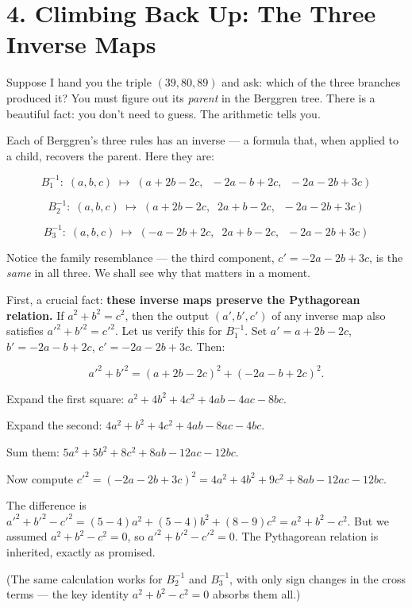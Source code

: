 \section{4. Climbing Back Up: The Three Inverse Maps}\label{ch14-climbing-back-up-the-three-inverse-maps}

Suppose I hand you the triple \((39, 80, 89)\) and ask: which of the three branches produced it? You must figure out its \emph{parent} in the Berggren tree. There is a beautiful fact: you don't need to guess. The arithmetic tells you.

Each of Berggren's three rules has an inverse --- a formula that, when applied to a child, recovers the parent. Here they are:

\[B_1^{-1}:\; (a,b,c) \;\longmapsto\; (a + 2b - 2c,\;\; -2a - b + 2c,\;\; -2a - 2b + 3c)\]

\[B_2^{-1}:\; (a,b,c) \;\longmapsto\; (a + 2b - 2c,\;\; 2a + b - 2c,\;\; -2a - 2b + 3c)\]

\[B_3^{-1}:\; (a,b,c) \;\longmapsto\; (-a - 2b + 2c,\;\; 2a + b - 2c,\;\; -2a - 2b + 3c)\]

Notice the family resemblance --- the third component, \(c' = -2a - 2b + 3c\), is the \emph{same} in all three. We shall see why that matters in a moment.

First, a crucial fact: \textbf{these inverse maps preserve the Pythagorean relation.} If \(a^2 + b^2 = c^2\), then the output \((a', b', c')\) of any inverse map also satisfies \({a'}^2 + {b'}^2 = {c'}^2\). Let us verify this for \(B_1^{-1}\). Set \(a' = a + 2b - 2c\), \(b' = -2a - b + 2c\), \(c' = -2a - 2b + 3c\). Then:

\[{a'}^2 + {b'}^2 = (a + 2b - 2c)^2 + (-2a - b + 2c)^2.\]

Expand the first square: \(a^2 + 4b^2 + 4c^2 + 4ab - 4ac - 8bc\).

Expand the second: \(4a^2 + b^2 + 4c^2 + 4ab - 8ac - 4bc\).

Sum them: \(5a^2 + 5b^2 + 8c^2 + 8ab - 12ac - 12bc\).

Now compute \({c'}^2 = (-2a - 2b + 3c)^2 = 4a^2 + 4b^2 + 9c^2 + 8ab - 12ac - 12bc\).

The difference is \({a'}^2 + {b'}^2 - {c'}^2 = (5-4)a^2 + (5-4)b^2 + (8-9)c^2 = a^2 + b^2 - c^2\). But we assumed \(a^2 + b^2 - c^2 = 0\), so \({a'}^2 + {b'}^2 - {c'}^2 = 0\). The Pythagorean relation is inherited, exactly as promised.

(The same calculation works for \(B_2^{-1}\) and \(B_3^{-1}\), with only sign changes in the cross terms --- the key identity \(a^2 + b^2 - c^2 = 0\) absorbs them all.)

